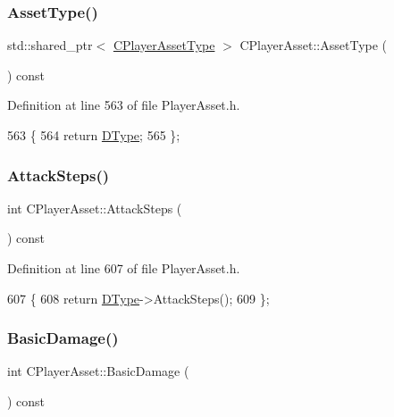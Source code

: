 \subsubsection{\texorpdfstring{Asset\+Type()}{AssetType()}}
{\footnotesize\ttfamily std\+::shared\+\_\+ptr$<$ \hyperlink{classCPlayerAssetType}{C\+Player\+Asset\+Type} $>$ C\+Player\+Asset\+::\+Asset\+Type (\begin{DoxyParamCaption}{ }\end{DoxyParamCaption}) const\hspace{0.3cm}{\ttfamily [inline]}}



Definition at line 563 of file Player\+Asset.\+h.


\begin{DoxyCode}
563                                                            \{
564             \textcolor{keywordflow}{return} \hyperlink{classCPlayerAsset_a5d61f73471e1e6f0a6ab15f2ffa7b359}{DType};  
565         \};
\end{DoxyCode}
\hypertarget{classCPlayerAsset_a33db708bb6bf66d67b54b24c322f27fa}{}\label{classCPlayerAsset_a33db708bb6bf66d67b54b24c322f27fa} 
\subsubsection{\texorpdfstring{Attack\+Steps()}{AttackSteps()}}
{\footnotesize\ttfamily int C\+Player\+Asset\+::\+Attack\+Steps (\begin{DoxyParamCaption}{ }\end{DoxyParamCaption}) const\hspace{0.3cm}{\ttfamily [inline]}}



Definition at line 607 of file Player\+Asset.\+h.


\begin{DoxyCode}
607                                \{
608             \textcolor{keywordflow}{return} \hyperlink{classCPlayerAsset_a5d61f73471e1e6f0a6ab15f2ffa7b359}{DType}->AttackSteps();
609         \};
\end{DoxyCode}
\hypertarget{classCPlayerAsset_a17dcdcd436e6edfab325bc4dbca4f03c}{}\label{classCPlayerAsset_a17dcdcd436e6edfab325bc4dbca4f03c} 
\subsubsection{\texorpdfstring{Basic\+Damage()}{BasicDamage()}}
{\footnotesize\ttfamily int C\+Player\+Asset\+::\+Basic\+Damage (\begin{DoxyParamCaption}{ }\end{DoxyParamCaption}) const\hspace{0.3cm}{\ttfamily [inline]}}



